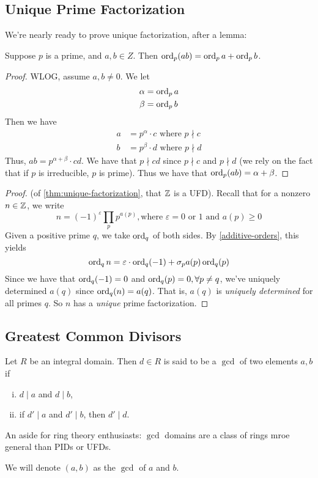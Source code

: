 \subsection{Unique Prime Factorization}
We're nearly ready to prove unique factorization, after a lemma:
\begin{lemma}\label{additive-orders}
    Suppose $p$ is a prime, and $a, b\in Z$. Then $\operatorname{ord}_p(ab) = \operatorname{ord}_p a + \operatorname{ord}_p b$.
\end{lemma}
\begin{proof}
    WLOG, assume $a, b\neq 0$. We let
    \begin{align*}
        \alpha & = \operatorname{ord}_p a \\
        \beta  & = \operatorname{ord}_p b
    \end{align*}
    Then we have
    \begin{align*}
        a & = p^\alpha\cdot c \text{ where }p\nmid c \\
        b & = p^\beta\cdot d \text{ where }p\nmid d
    \end{align*}
    Thus, $ab = p^{\alpha + \beta}\cdot cd$. We have that $p\nmid cd$ since $p\nmid c$ and $p\nmid d$ (we rely on the fact that if $p$ is irreducible, $p$ is prime). Thus we have that $\operatorname{ord}_p (ab) = \alpha + \beta$.
\end{proof}

\begin{proof}
    (of \cref{thm:unique-factorization}, that $\mathbb Z$ is a UFD). Recall that for a nonzero $n\in \mathbb Z$, we write
    \[n = (-1)^\varepsilon \prod_{p}p^{a(p)}, \text{where }\varepsilon = 0\text{ or }1\text{ and }a(p)\geq 0\]
    Given a positive prime $q$, we take $\operatorname{ord}_q$ of both sides. By \cref{additive-orders}, this yields
    \[\operatorname{ord}_q n = \varepsilon\cdot \operatorname{ord}_q (-1) + \sigma_p a(p)\operatorname{ord}_q(p)\]
    Since we have that $\operatorname{ord}_q(-1) = 0$ and $\operatorname{ord}_q(p) = 0, \forall p\neq q$, we've uniquely determined $a(q)$ since $\operatorname{ord}_q(n) = a(q)$. That is, $a(q)$ is \emph{uniquely determined} for all primes $q$. So $n$ has a \emph{unique} prime factorization.
\end{proof}

\subsection{Greatest Common Divisors}
\begin{definition}
    Let $R$ be an integral domain. Then $d\in R$ is said to be a $\gcd$ of two elements $a, b$ if
    \begin{enumerate}[i)]
        \item $d\mid a$ and $d\mid b$,
        \item if $d'\mid a$ and $d'\mid b$, then $d'\mid d$.
    \end{enumerate}
\end{definition}
\begin{remark*}
    An aside for ring theory enthusiasts: $\gcd$ domains are a class of rings mroe general than PIDs or UFDs.
\end{remark*}
We will denote $(a, b)$ as the $\gcd$ of $a$ and $b$.


